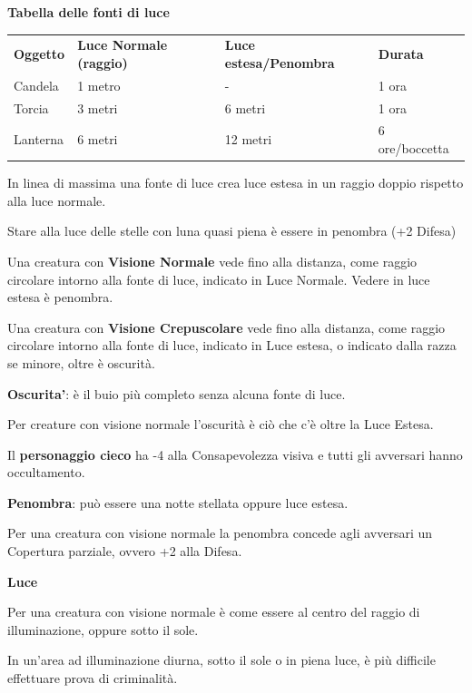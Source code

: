 \documentclass[a4paper,11pt,twoside,openany]{book}
\begin{document}
\medskip

\textbf{Tabella delle fonti di luce}

\medskip


\begin{tabular}{llll}
	\toprule
	\textbf{Oggetto} & \textbf{Luce Normale (raggio)} & \textbf{Luce estesa/Penombra} & \textbf{Durata}\tabularnewline
	Candela          & 1 metro         & -              & 1 ora\tabularnewline
	Torcia           & 3 metri         & 6 metri        & 1 ora\tabularnewline
	Lanterna         & 6 metri         & 12 metri       & 6 ore/boccetta\tabularnewline
\end{tabular}

\bigskip

In linea di massima una fonte di luce crea luce estesa in un raggio doppio rispetto alla luce normale.

Stare alla luce delle stelle con luna quasi piena è essere in penombra (+2 Difesa)

Una creatura con \textbf{Visione Normale} vede fino alla distanza, come raggio circolare intorno alla fonte di luce, indicato in Luce Normale. Vedere in luce estesa è penombra.

Una creatura con \textbf{Visione Crepuscolare} vede fino alla distanza, come raggio circolare intorno alla fonte di luce, indicato in Luce estesa, o indicato dalla razza se minore, oltre è oscurità.

\textbf{Oscurita'}: è il buio più completo senza alcuna fonte di luce.

Per creature con visione normale l'oscurità è ciò che c'è oltre la Luce Estesa.

Il \textbf{personaggio cieco} ha -4 alla Consapevolezza visiva e tutti gli avversari hanno occultamento.

\textbf{Penombra}: può essere una notte stellata oppure luce estesa.

Per una creatura con visione normale la penombra concede agli avversari
un Copertura parziale, ovvero +2 alla Difesa.

\textbf{Luce}

Per una creatura con visione normale è come essere al centro del raggio di illuminazione, oppure sotto il sole.

In un'area ad illuminazione diurna, sotto il sole o in piena luce, è più difficile effettuare prova di criminalità.
\end{document}

